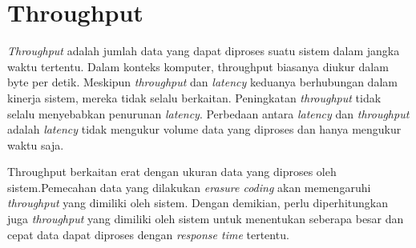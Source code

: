 \section{Throughput}

\textit{Throughput} adalah jumlah data yang dapat diproses suatu sistem dalam jangka waktu tertentu. Dalam konteks komputer, throughput biasanya diukur dalam byte per detik. Meskipun \textit{throughput} dan \textit{latency} keduanya berhubungan dalam kinerja sistem, mereka tidak selalu berkaitan. Peningkatan \textit{throughput} tidak selalu menyebabkan penurunan \textit{latency}. Perbedaan antara \textit{latency} dan \textit{throughput} adalah \textit{latency} tidak mengukur volume data yang diproses dan hanya mengukur waktu saja.

Throughput berkaitan erat dengan ukuran data yang diproses oleh sistem.Pemecahan data yang dilakukan \textit{erasure coding} akan memengaruhi \textit{throughput} yang dimiliki oleh sistem. Dengan demikian, perlu diperhitungkan juga \textit{throughput} yang dimiliki oleh sistem untuk menentukan seberapa besar dan cepat data dapat diproses dengan \textit{response time} tertentu.